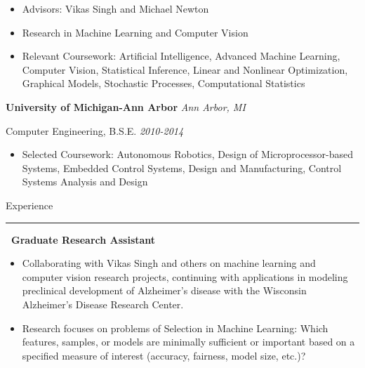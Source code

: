 \documentclass[]{article}
\begin{document}
	\vspace{-5pt}
	\begin{itemize}[label={$\bullet$}]
		\item Advisors: Vikas Singh and Michael Newton
		\item Research in Machine Learning and Computer Vision
		\item Relevant Coursework: Artificial Intelligence, Advanced Machine Learning, Computer Vision, Statistical Inference, Linear and Nonlinear Optimization, Graphical Models, Stochastic Processes, Computational Statistics
	\end{itemize}
 {{\bf\large University of Michigan-Ann Arbor} \hfill \textit{Ann Arbor, MI} }
 
	{ Computer Engineering, B.S.E. \hfill \textit{2010-2014} }
	
	\vspace{-5pt}
	\begin{itemize}[label={$\bullet$}]
		\item Selected Coursework: Autonomous Robotics, Design of Microprocessor-based Systems, Embedded Control Systems, Design and Manufacturing, Control Systems Analysis and Design
	\end{itemize}

\vspace{15pt}
{\LARGE Experience}
\hrule
\vspace{10pt}

 \newline
{\bf \ Graduate Research Assistant}
\begin{itemize}[label={$\bullet$}]
	\item Collaborating with Vikas Singh and others on machine learning and computer vision research projects, continuing with applications in modeling preclinical development of Alzheimer's disease with the Wisconsin Alzheimer's Disease Research Center.
	\item Research focuses on problems of Selection in Machine Learning: Which features, samples, or models are minimally sufficient or important based on a specified measure of interest (accuracy, fairness, model size, etc.)?
\end{itemize} 
\end{document}
